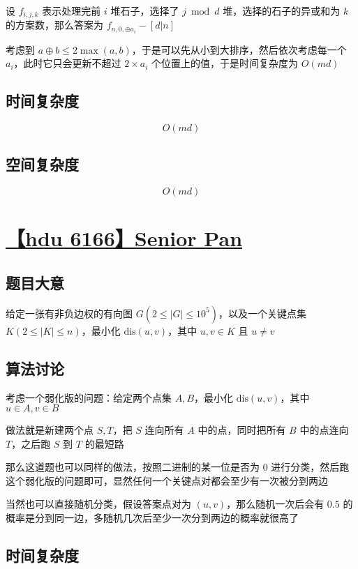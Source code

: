 \documentclass[UTF8]{article}
\begin{document}
设 $f_{i, j, k}$ 表示处理完前 $i$ 堆石子，选择了 $j \bmod d$ 堆，选择的石子的异或和为 $k$ 的方案数，那么答案为 $f_{n,0,\oplus a_i}-[d | n]$

考虑到 $a \oplus b \le 2 \max(a,b)$，于是可以先从小到大排序，然后依次考虑每一个 $a_i$，此时它只会更新不超过 $2 \times a_i$ 个位置上的值，于是时间复杂度为 $O(md)$

\subsection{时间复杂度}

$$
O(md)
$$

\subsection{空间复杂度}

$$
O(md)
$$

\section{\href{http://acm.hdu.edu.cn/showproblem.php?pid=6166}{【hdu 6166】Senior Pan}}

\subsection{题目大意}

给定一张有非负边权的有向图 $G(2 \le |G| \le 10^5)$，以及一个关键点集 $K(2 \le |K| \le n)$，最小化 $\text{dis}(u,v)$，其中 $u,v \in K$ 且 $u \not= v$

\subsection{算法讨论}

考虑一个弱化版的问题：给定两个点集 $A,B$，最小化 $\text{dis}(u,v)$，其中 $u \in A,v \in B$

做法就是新建两个点 $S,T$，把 $S$ 连向所有 $A$ 中的点，同时把所有 $B$ 中的点连向 $T$，之后跑 $S$ 到 $T$ 的最短路

那么这道题也可以同样的做法，按照二进制的某一位是否为 $0$ 进行分类，然后跑这个弱化版的问题即可，显然任何一个关键点对都会至少有一次被分到两边

当然也可以直接随机分类，假设答案点对为 $(u,v)$，那么随机一次后会有 $0.5$ 的概率是分到同一边，多随机几次后至少一次分到两边的概率就很高了

\subsection{时间复杂度}
\end{document}
